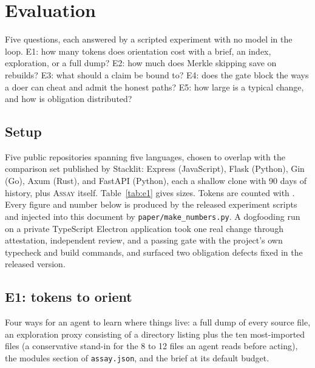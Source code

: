 \documentclass[conference]{IEEEtran}
\newcommand{\assay}{\textsc{Assay}}
\begin{document}
\section{Evaluation}

Five questions, each answered by a scripted experiment with no model in the loop. E1: how many tokens does orientation cost with a brief, an index, exploration, or a full dump? E2: how much does Merkle skipping save on rebuilds? E3: what should a claim be bound to? E4: does the gate block the ways a doer can cheat and admit the honest paths? E5: how large is a typical change, and how is obligation distributed?

\subsection{Setup}

Five public repositories spanning five languages, chosen to overlap with the comparison set published by Stacklit: Express (JavaScript), Flask (Python), Gin (Go), Axum (Rust), and FastAPI (Python), each a shallow clone with 90 days of history, plus \assay{} itself. Table~\ref{tab:e1} gives sizes. Tokens are counted with \EstimatorName. Every figure and number below is produced by the released experiment scripts and injected into this document by \texttt{paper/make\_numbers.py}. A dogfooding run on a private TypeScript Electron application took one real change through attestation, independent review, and a passing gate with the project's own typecheck and build commands, and surfaced two obligation defects fixed in the released version.

\subsection{E1: tokens to orient}

Four ways for an agent to learn where things live: a full dump of every source file, an exploration proxy consisting of a directory listing plus the ten most-imported files (a conservative stand-in for the 8 to 12 files an agent reads before acting), the modules section of \texttt{assay.json}, and the brief at its default budget.

\begin{table}[t]
  \centering\footnotesize
  \caption{E1: tokens required to orient an agent, by method. Index is the complete \texttt{assay.json} including per-file entries. Modules only is the section an agent would read whole. Gain is exploration divided by brief.}
  \label{tab:e1}
  
\end{table}
\end{document}
